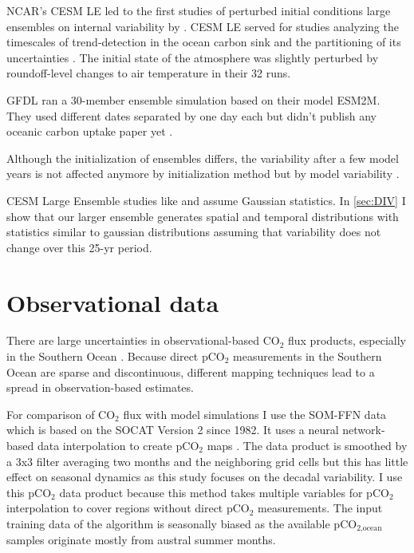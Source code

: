 \acs{NCAR}'s \ac{CESM} \acs{LE} \citep{Kay2015} led to the first studies of perturbed initial conditions large ensembles on internal variability by \cite{Deser2012}. \acs{CESM} \acs{LE} served for studies analyzing the timescales of trend-detection in the ocean carbon sink \citep{McKinley2016} and the partitioning of its uncertainties \citep{Lovenduski2016}. The initial state of the atmosphere was slightly perturbed by roundoff-level changes to air temperature in their 32 runs. 

\ac{GFDL} ran a 30-member ensemble simulation based on their model ESM2M. They used different dates separated by one day each but didn't publish any oceanic carbon uptake paper yet \citep{Rodgers2015}.

Although the initialization of ensembles differs, the variability after a few model years is not affected anymore by initialization method but by model variability \citep{Hawkins2009}.

\acs{CESM} Large Ensemble studies like \cite{Deser2012} and \cite{Thompson2015} assume Gaussian statistics. In \autoref{sec:DIV} I show that our larger ensemble generates spatial and temporal distributions with statistics similar to gaussian distributions assuming that variability does not change over this 25-yr period.








\section{Observational data}
There are large uncertainties in observational-based CO$_2$ flux products, especially in the Southern Ocean \citep{Roedenbeck2015}. Because direct pCO$_2$ measurements in the Southern Ocean are sparse and discontinuous, different mapping techniques lead to a spread in observation-based estimates.

For comparison of CO$_2$ flux with model simulations I use the \ac{SOM-FFN} data which is based on the \ac{SOCAT} Version 2 \citep{Bakker2014} since 1982. It uses a neural network-based data interpolation to create pCO$_2$ maps \citep{Landschuetzer2013,Landschuetzer2014,Landschuetzer2016}. The data product is smoothed by a 3x3 filter averaging two months and the neighboring grid cells but this has little effect on seasonal dynamics as this study focuses on the decadal variability. I use this pCO$_2$ data product because this method takes multiple variables for pCO$_2$ interpolation to cover regions without direct pCO$_2$ measurements. The input training data of the algorithm is seasonally biased as the available pCO$_{\text{2,ocean}}$ samples originate mostly from austral summer months.

